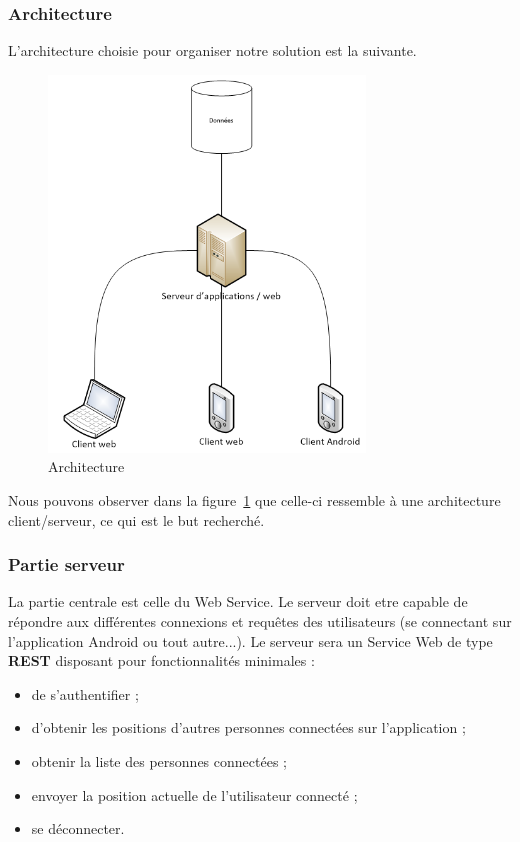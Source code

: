 \subsubsection{Architecture}

L'architecture choisie pour organiser notre solution est la suivante.

\begin{figure}[H]
    \centering
    \includegraphics[height=10cm]{../infrastructure.png}
    \caption{Architecture}
    \label{architecture}
\end{figure}

Nous pouvons observer dans la figure~\ref{architecture} que celle-ci ressemble à une architecture client/serveur, ce qui est le but recherché.

\subsubsection{Partie serveur}
La partie centrale est celle du Web Service. Le serveur doit etre capable de répondre aux différentes connexions et requêtes des utilisateurs (se connectant sur l'application Android ou tout autre...). Le serveur sera un Service Web de type \textbf{REST} disposant pour fonctionnalités minimales :
\begin{itemize}
    \item de s'authentifier ;
    \item d'obtenir les positions d'autres personnes connectées sur l'application ;
    \item obtenir la liste des personnes connectées ;
    \item envoyer la position actuelle de l'utilisateur connecté ;
    \item se déconnecter.
\end{itemize}


